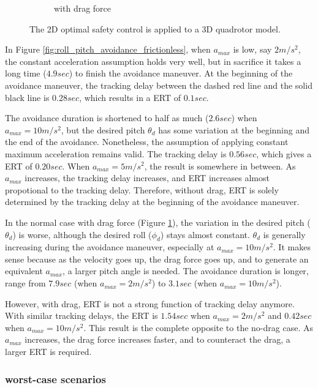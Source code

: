 \documentclass[journal,11pt,onecolumn,draftclsnofoot,]{IEEEtran}
\begin{document}
\begin{figure}
\begin{subfigure}{.45\columnwidth}
        \caption{with drag force}
        \label{fig:roll_pitch_avoidance_friction}
    \end{subfigure}
    \caption{The 
    2D optimal safety control is applied to a 3D quadrotor model.}
    \label{fig:roll_pitch_avoidance}
\end{figure}

In Figure \ref{fig:roll_pitch_avoidance_frictionless}, when $a_{max}$ is low, say $2m/s^2$, the constant acceleration assumption holds very well, but in sacrifice it takes a long time ($4.9 sec$) to finish the avoidance maneuver. At the beginning of the avoidance maneuver, the tracking delay between the dashed red line and the solid black line is $0.28sec$, which results in a ERT of $0.1sec$.

The avoidance duration is shortened to half as much ($2.6 sec$) when $a_{max}=10m/s^2$, but the desired pitch $\theta_d$ has some variation at the beginning and the end of the avoidance. Nonetheless, the assumption of applying constant maximum acceleration remains valid. The tracking delay is $0.56sec$, which gives a ERT of $0.20sec$. When $a_{max}=5m/s^2$, the result is somewhere in between. As $a_{max}$ increases, the tracking delay increases, and ERT increases almost propotional to the tracking delay. Therefore, without drag, ERT is solely determined by the tracking delay at the beginning of the avoidance maneuver.

In the normal case with drag force (Figure \ref{fig:roll_pitch_avoidance_friction}), the variation in the desired pitch ($\theta_d$) is worse, although the desired roll ($\phi_d$) stays almost constant. $\theta_d$ is generally increasing during the avoidance maneuver, especially at $a_{max}=10m/s^2$. It makes sense because as the velocity goes up, the drag force goes up, and to generate an equivalent $a_{max}$, a larger pitch angle is needed. The avoidance duration is longer, range from $7.9sec$ (when $a_{max}=2m/s^2$) to $3.1sec$ (when $a_{max}=10m/s^2$).

However, with drag, ERT is not a strong function of tracking delay anymore. With similar tracking delays, the ERT is $1.54sec$ when $a_{max}=2m/s^2$ and $0.42sec$ when $a_{max}=10m/s^2$. This result is the complete opposite to the no-drag case. As $a_{max}$ increases, the drag force increases faster, and to counteract the drag, a larger ERT is required.


\subsubsection{worst-case scenarios}
\end{document}
